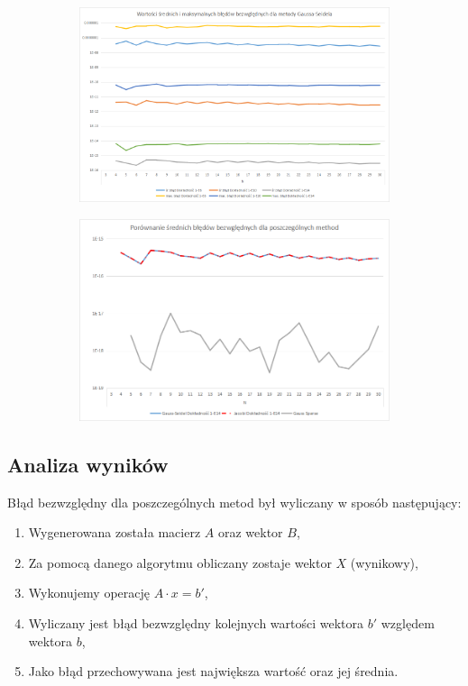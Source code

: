 \documentclass[10pt]{article}
\begin{document}
\begin{figure}[h]
\begin{subfigure}{0.5\textwidth}
	\caption{ \label{Rys2c}}
\end{subfigure}
	\begin{subfigure}{0.5\textwidth}
	\includegraphics[width=\textwidth]{5.png}
	\caption{ \label{Rys2d}}
\end{subfigure}
	\begin{subfigure}{0.5\textwidth}
	\includegraphics[width=\textwidth]{6.png}
	\caption{ \label{Rys2e}}
\end{subfigure}
\end{figure}
\subsection{Analiza wyników}
Błąd bezwzględny dla poszczególnych metod był wyliczany w sposób następujący:
\begin{enumerate}
	\item Wygenerowana została macierz $A$ oraz wektor $B$,
	\item Za pomocą danego algorytmu obliczany zostaje wektor $X$ (wynikowy),
	\item Wykonujemy operację $A\cdot x = b'$,
	\item Wyliczany jest błąd bezwzględny kolejnych wartości wektora $b'$ względem wektora $b$,
	\item Jako błąd przechowywana jest największa wartość oraz jej średnia.
\end{enumerate}
\end{document}
